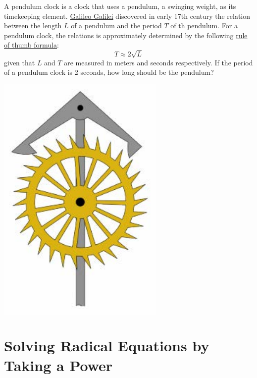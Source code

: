 \documentclass[en,11pt]{elegantbook}
\newcommand{\size}[2]{{\fontsize{#1}{0}\selectfont#2}}
\newenvironment{rmdthink}{
	\vspace*{0.5\baselineskip}
	\par\noindent
	\makebox[-4pt][r]{\color{green!90}\size{12}{\faLightbulbO}\,\,}
    \begin{tcolorbox}[
    enhanced,
    title={\textbf{\color{second}Think}},
    title style={left color=blue!10!green!20!white,right color=yellow!20!blue!20!white},
    colback=green!20!white,
    ]
    \sffamily
}{
    \end{tcolorbox}
	\par\ignorespacesafterend
}
\begin{document}
\begin{rmdthink}

\begin{multicols}{2}

A pendulum clock is a clock that uses a pendulum, a swinging weight, as its timekeeping element. \href{https://en.wikipedia.org/wiki/Galileo_Galilei}{Galileo Galilei} discovered in early 17th century the relation between the length \(L\) of a pendulum and the period \(T\) of th pendulum. For a pendulum clock, the relations is approximately determined by the following \href{https://en.wikipedia.org/wiki/Pendulum_(mathematics)}{rule of thumb formula}:
\[
T\approx 2\sqrt{L}
\]
given that \(L\) and \(T\) are measured in meters and seconds respectively. If the period of a pendulum clock is 2 seconds, how long should be the pendulum?

\begin{center}\includegraphics[width=0.6\linewidth]{figs/pendulum-clock} \end{center}

\end{multicols}

\end{rmdthink}

\hypertarget{solving-radical-equations-by-taking-a-power}{%
\section{Solving Radical Equations by Taking a Power}\label{solving-radical-equations-by-taking-a-power}}
\end{document}
